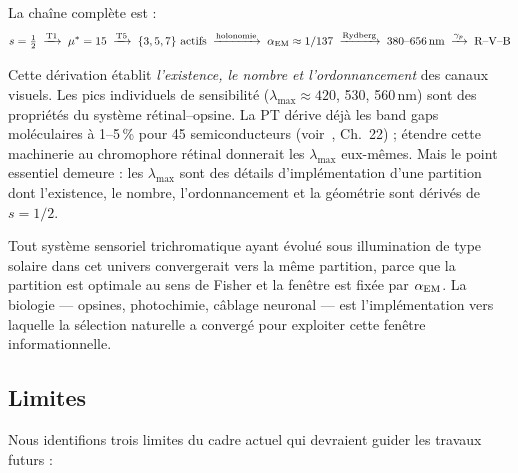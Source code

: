 \documentclass[12pt,a4paper]{article}
\begin{document}
La cha\^ine compl\`ete est :
\begin{equation}
  s = \tfrac{1}{2}
  \;\xrightarrow{\text{T1}}\;
  {\mu^{*}} = 15
  \;\xrightarrow{\text{T5}}\;
  \{3,5,7\} \text{ actifs}
  \;\xrightarrow{\text{holonomie}}\;
  \alpha_{\mathrm{EM}} \approx 1/137
  \;\xrightarrow{\text{Rydberg}}\;
  380\text{--}656\,\text{nm}
  \;\xrightarrow{\gamma_{p}}\;
  \text{R--V--B}
  \label{eq:chain}
\end{equation}

\begin{remark}
Cette d\'erivation \'etablit \emph{l'existence, le nombre et
l'ordonnancement} des canaux visuels. Les pics individuels de
sensibilit\'e ($\lambda_{\max} \approx 420$, 530, 560\,nm) sont des
propri\'et\'es du syst\`eme r\'etinal--opsine. La PT d\'erive d\'ej\`a
les band gaps mol\'eculaires \`a 1--5\,\% pour 45 semiconducteurs
(voir~\cite{senez2026math}, Ch.~22) ; \'etendre cette machinerie au
chromophore r\'etinal donnerait les $\lambda_{\max}$ eux-m\^emes.
Mais le point essentiel demeure : les $\lambda_{\max}$ sont des
d\'etails d'impl\'ementation d'une partition dont l'existence, le
nombre, l'ordonnancement et la g\'eom\'etrie sont d\'eriv\'es de
$s = 1/2$.
\end{remark}

\begin{remark}
Tout syst\`eme sensoriel trichromatique ayant \'evolu\'e sous
illumination de type solaire dans cet univers convergerait vers la
m\^eme partition, parce que la partition est optimale au sens de Fisher
et la fen\^etre est fix\'ee par $\alpha_{\mathrm{EM}}$. La biologie --- opsines,
photochimie, c\^ablage neuronal --- est l'impl\'ementation vers
laquelle la s\'election naturelle a converg\'e pour exploiter cette
fen\^etre informationnelle.
\end{remark}

\subsection{Limites}

Nous identifions trois limites du cadre actuel qui devraient guider les
travaux futurs :
\end{document}
